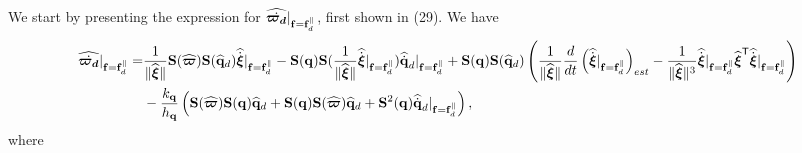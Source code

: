 \documentclass[journal,onecolumn]{IEEEtran}
\begin{document}
	We start by presenting the expression for $\widehat{\dot{\bs{\varpi_d}}}|_{\f=\fd^{\|}}$, first shown in (29).
    We have
    \begin{align}
    	\widehat{\dot{\bs{\varpi_d}}}|_{\f=\fd^{\|}} =& \frac{1}{\|\widehat{\Xiq}\|}
    	\Skew{\widehat{\bs{\varpi}}}\Skew{\qdhat}\widehat{\dot{\Xiq}}|_{\f=\f_d^{\|}}
    	-\Skew{\dir}\Skew{\frac{1}{\|\widehat{\Xiq}\|}\widehat{\dot{\Xiq}}|_{\f=\f_d^{\|}}}\qddothat|_{\f=\f_d^{\|}} +\Skew{\dir}\Skew{\qdhat}\LP\frac{1}{\|\widehat{\Xiq}\|}\frac{d}{dt}\LP\widehat{\dot{\Xiq}}|_{\f=\fd^{\|}}\RP_{est}
    	-\frac{1}{\|\widehat{\Xiq}\|^3}\widehat{\dot{\Xiq}}|_{\f=\f_d^{\|}}\widehat{\Xiq}\trs\widehat{\dot{\Xiq}}|_{\f=\f_d^{\|}}\RP\nonumber\\ &-\frac{k_\v{q}}{h_\v{q}}\LP\Skew{\widehat{\bs{\varpi}}}\Skew{\dir}\qdhat +\Skew{\dir}\Skew{\widehat{\bs{\varpi}}}\qdhat +\Skew[2]{\dir}\qddothat|_{\f=\f_d^{\|}}\RP,
    \end{align}
    where
\end{document}
